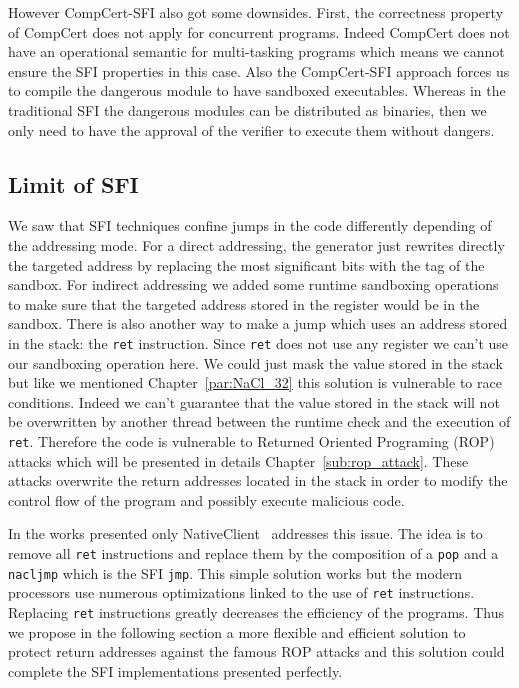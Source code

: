 \documentclass[11pt]{sdm}
\begin{document}
However CompCert-SFI also got some downsides. First, the correctness property of CompCert does not apply for concurrent programs. Indeed CompCert does not have an operational semantic for multi-tasking programs which means we cannot ensure the SFI properties in this case. Also the CompCert-SFI approach forces us to compile the dangerous module to have sandboxed executables.
Whereas in the traditional SFI the dangerous modules can be distributed as binaries, then we only need to have the approval of the verifier to execute them without dangers. \\


\subsection{Limit of SFI}
\label{sub:Limits of SFI}

We saw that SFI techniques confine jumps in the code differently depending of the addressing mode. For a direct addressing, the generator just rewrites directly the targeted address by replacing the most significant bits with the tag of the sandbox. For indirect addressing we added some runtime sandboxing operations to make sure that the targeted address stored in the register would be in the sandbox. There is also another way to make a jump which uses an address stored in the stack: the \texttt{ret} instruction. Since \texttt{ret} does not use any register we can't use our sandboxing operation here. We could just mask the value stored in the stack but like we mentioned Chapter~\ref{par:NaCl_32} this solution is vulnerable to race conditions. Indeed we can't guarantee that the value stored in the stack will not be overwritten by another thread between the runtime check and the execution of \texttt{ret}. Therefore the code is vulnerable to Returned Oriented Programing (ROP) attacks which will be presented in details Chapter~\ref{sub:rop_attack}. These attacks overwrite the return addresses located in the stack in order to modify the control flow of the program and possibly execute malicious code. 

In the works presented only NativeClient~\cite{Yee:2010:NCS:1629175.1629203} addresses this issue. The idea is to remove all \texttt{ret} instructions and replace them by the composition of a \texttt{pop} and a \texttt{nacljmp} which is the SFI \texttt{jmp}. 
This simple solution works but the modern processors use numerous optimizations linked to the use of \texttt{ret} instructions. Replacing \texttt{ret} instructions greatly decreases the efficiency of the programs. 
Thus we propose in the following section a more flexible and efficient solution to protect return addresses against the famous ROP attacks and this solution could complete the SFI implementations presented perfectly. 
\end{document}
